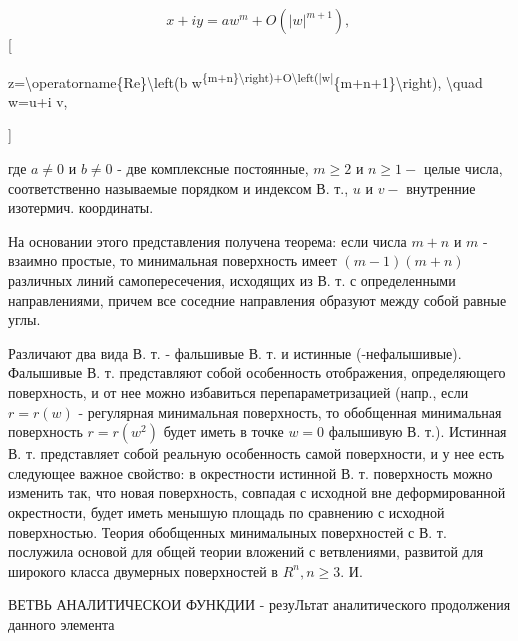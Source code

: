 \documentclass[10pt]{article}
\begin{document}
\[

x+i y=a w^{m}+O\left(|w|^{m+1}\right) \text {, }

\][



z=\textbackslash operatorname\{Re\}\textbackslash left(b w\textsuperscript{\{m+n\}\textbackslash right)+O\textbackslash left(|w|}\{m+n+1\}\textbackslash right), \textbackslash quad w=u+i v,

]



где $a \neq 0$ и $b \neq 0$ - две комплексные постоянные, $m \geqslant 2$ и $n \geqslant 1-$ целые числа, соответственно называемые порядком и индексом В. т., $u$ и $v-$ внутренние изотермич. координаты.



На основании этого представления получена теорема: если числа $m+n$ и $m$ - взаимно простые, то минимальная поверхность имеет $(m-1)(m+n)$ различных линий самопересечения, исходящих из В. т. с определенными направлениями, причем все соседние направления образуют между собой равные углы.



Различают два вида В. т. - фальшивые В. т. и истинные (-нефалышивые). Фалышивые В. т. представляют собой особенность отображения, определяющего поверхность, и от нее можно избавиться перепараметризацией (напр., если $r=r(w)$ - регулярная минимальная поверхность, то обобщенная минимальная поверхность $r=r\left(w^{2}\right)$ будет иметь в точке $w=0$ фалышивую В. т.). Истинная В. т. представляет собой реальную особенность самой поверхности, и у нее есть следующее важное свойство: в окрестности истинной В. т. поверхность можно изменить так, что новая поверхность, совпадая с исходной вне деформированной окрестности, будет иметь менышую площадь по сравнению с исходной поверхностью. Теория обобщенных минималыных поверхностей с В. т. послужила основой для общей теории вложений с ветвлениями, развитой для широкого класса двумерных поверхностей в $R^{n}, n \geqslant 3$. И.



ВЕТВЬ АНАЛИТИЧЕСКОИ ФУНКДИИ - резуЛьтат аналитического продолжения данного элемента
\end{document}
